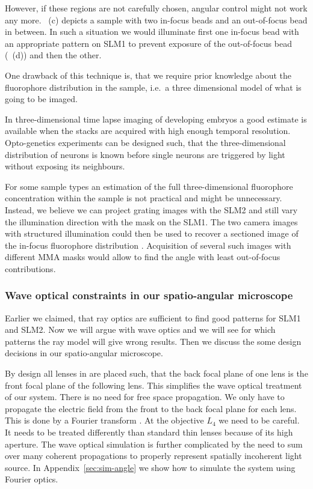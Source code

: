 However, if these regions are not carefully chosen, angular control
might not work any more. ~(c) depicts a
sample with two in-focus beads and an out-of-focus bead in between. In
such a situation we would illuminate first one in-focus bead with an
appropriate pattern on SLM1 to prevent exposure of the out-of-focus
bead (~(d)) and then the other. 

One drawback of this technique is, that we require prior knowledge
about the fluorophore distribution in the sample, i.e.\ a three
dimensional model of what is going to be imaged.

In three-dimensional time lapse imaging of developing embryos a good
estimate is available when the stacks are acquired with high enough
temporal resolution. Opto-genetics experiments can be designed such,
that the three-dimensional distribution of neurons is known before
single neurons are triggered by light without exposing its neighbours.

For some sample types an estimation of the full three-dimensional
fluorophore concentration within the sample is not practical and might
be unnecessary. Instead, we believe we can project grating images with
the SLM2 and still vary the illumination direction with the mask on
the SLM1. The two camera images with structured illumination could then
be used to recover a sectioned image of the in-focus fluorophore
distribution \citep{2008Lim,Bozinovic2008,2009Santos}. Acquisition of
several such images with different MMA masks would allow to find the
angle with least out-of-focus contributions.


\subsubsection{Wave optical constraints in our spatio-angular microscope}
\label{sec:wave-constraints}
Earlier we claimed, that ray optics are sufficient to find good
patterns for SLM1 and SLM2. Now we will argue with wave optics and we
will see for which patterns the ray model will give wrong
results. Then we discuss the some design decisions in our
spatio-angular microscope.

By design all lenses in  are placed such, that
the back focal plane of one lens is the front focal plane of the
following lens. This simplifies the wave optical treatment of our
system. There is no need for free space propagation. We only have to
propagate the electric field from the front to the back focal plane
for each lens. This is done by a Fourier transform
\citep{Goodman1996}. At the objective $L_4$ we need to be careful. It
needs to be treated differently than standard thin lenses because of
its high aperture. The wave optical simulation is further complicated
by the need to sum over many coherent propagations to properly
represent spatially incoherent light source.  In
Appendix~\ref{sec:sim-angle} we show how to simulate the system using
Fourier optics.

